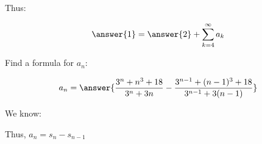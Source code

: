 \documentclass{ximera}
\begin{document}
\begin{exercise}
\begin{exercise}
\begin{exercise}
\begin{exercise}
Thus:

\[
\answer{1} = \answer{2} + \sum_{k=4}^{\infty} a_k
\]
\begin{exercise}
Find a formula for $a_n$:

\[
a_n = \answer{\frac{3^n+n^3+18}{3^n+3n}-\frac{3^{n-1}+(n-1)^3+18}{3^{n-1}+3(n-1)}}
\]

\begin{hint}
We know: 
\begin{image}
  \end{image}
  
  Thus, $a_n = s_n-s_{n-1}$
\end{hint}
\end{exercise}
\end{exercise}
\end{exercise}
\end{exercise}
\end{exercise}
\end{document}
